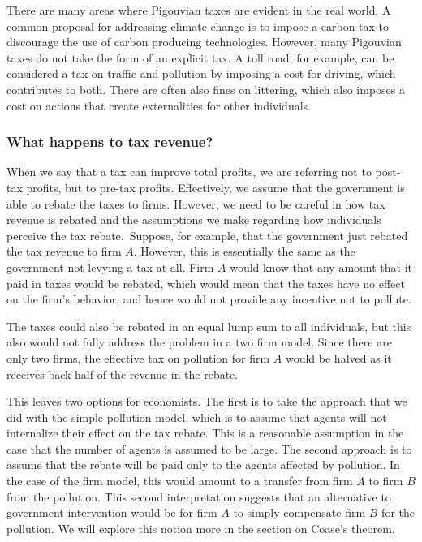 There are many areas where Pigouvian taxes are evident in the real world. A common proposal for addressing climate change is to impose a carbon tax to discourage the use of carbon producing technologies. However, many Pigouvian taxes do not take the form of an explicit tax. A toll road, for example, can be considered a tax on traffic and pollution by imposing a cost for driving, which contributes to both. There are often also fines on littering, which also imposes a cost on actions that create externalities for other individuals. 

\subsubsection*{What happens to tax revenue?}
When we say that a tax can improve total profits, we are referring not to post-tax profits, but to pre-tax profits. Effectively, we assume that the government is able to rebate the taxes to firms. However, we need to be careful in how tax revenue is rebated and the assumptions we make regarding how individuals perceive the tax rebate. Suppose, for example, that the government just rebated the tax revenue to firm $A$. However, this is essentially the same as the government not levying a tax at all. Firm $A$ would know that any amount that it paid in taxes would be rebated, which would mean that the taxes have no effect on the firm's behavior, and hence would not provide any incentive not to pollute. 

The taxes could also be rebated in an equal lump sum to all individuals, but this also would not fully address the problem in a two firm model. Since there are only two firms, the effective tax on pollution for firm $A$ would be halved as it receives back half of the revenue in the rebate. 

This leaves two options for economists. The first is to take the approach that we did with the simple pollution model, which is to assume that agents will not internalize their effect on the tax rebate. This is a reasonable assumption in the case that the number of agents is assumed to be large. The second approach is to assume that the rebate will be paid only to the agents affected by pollution. In the case of the firm model, this would amount to a transfer from firm $A$ to firm $B$ from the pollution. This second interpretation suggests that an alternative to government intervention would be for firm $A$ to simply compensate firm $B$ for the pollution. We will explore this notion more in the section on Coase's theorem. 

